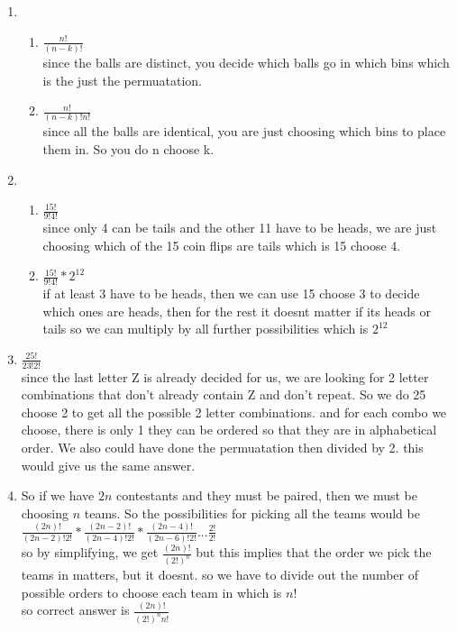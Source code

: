 \documentclass[11pt]{article}
\begin{document}
\begin{enumerate}
\begin{enumerate}
\end{enumerate}

\item 
\begin{enumerate}

\item $\frac{n!}{(n-k)!}$\\since the balls are distinct, you decide which balls go in which bins which is the just the permuatation.

\item $\frac{n!}{(n-k)!n!}$ \\ since all the balls are identical, you are just choosing which bins to place them in. So you do n choose k. 
\end{enumerate}

\item
\begin{enumerate}
\item $\frac{15!}{9!4!}$ \\ since only 4 can be tails and the other 11 have to be heads, we are just choosing which of the 15 coin flips are tails which is 15 choose 4.
\item $\frac{15!}{9!4!}*2^{12}$ \\ if at least 3 have to be heads, then we can use 15 choose 3 to decide which ones are heads, then for the rest it doesnt matter if its heads or tails so we can multiply by all further possibilities which is $2^{12}$
\end{enumerate}

\item $\frac{25!}{23!2!}$ \\ since the last letter Z is already decided for us, we are looking for 2 letter combinations that don't already contain Z and don't repeat. So we do 25 choose 2 to get all the possible 2 letter combinations. and for each combo we choose, there is only 1 they can be ordered so that they are in alphabetical order. We also could have done the permuatation then divided by 2. this would give us the same answer. 

\item So if we have $2n$ contestants and they must be paired, then we must be choosing $n$ teams. So the possibilities for picking all the teams would be\\ $\frac{(2n)!}{(2n-2)!2!}*\frac{(2n-2)!}{(2n-4)!2!}*\frac{(2n-4)!}{(2n-6)!2!}...\frac{2!}{2!}$ \\ so by simplifying, we get $\frac{(2n)!}{(2!)^{n}}$ but this implies that the order we pick the teams in matters, but it doesnt. so we have to divide out the number of possible orders to choose each team in which is $n!$\\ so correct answer is $\frac{(2n)!}{(2!)^{n}n!}$


\end{enumerate}
\end{document}

